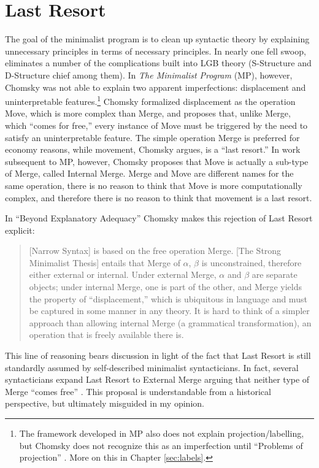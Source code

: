 \documentclass[MilwayThesis]{subfiles}
\begin{document}
\section{Last Resort}
The goal of the minimalist program is to clean up syntactic theory by explaining unnecessary principles in terms of necessary principles.
In nearly one fell swoop, \textcite{chomsky1995minimalist} eliminates a number of the complications built into LGB theory (S-Structure and D-Structure chief among them).
In \textit{The Minimalist Program} (MP), however, Chomsky was not able to explain two apparent imperfections: displacement and uninterpretable features.\footnote{
	The framework developed in MP also does not explain projection/labelling, but Chomsky does not recognize this as an imperfection until ``Problems of projection'' \parencite{chomsky2013problems}.
	More on this in Chapter \ref{sec:labels}.
}
Chomsky formalized displacement as the operation Move, which is more complex than Merge, and proposes that, unlike Merge, which ``comes for free,'' every instance of Move must be triggered by the need to satisfy an uninterpretable feature.
The simple operation Merge is preferred for economy reasons, while movement, Chomsky argues, is a ``last resort.''
In work subsequent to MP, however, Chomsky proposes that Move is actually a sub-type of Merge, called Internal Merge.
Merge and Move are different names for the same operation, there is no reason to think that Move is more computationally complex, and therefore there is no reason to think that movement is a last resort.

In ``Beyond Explanatory Adequacy'' \parencite{chomsky2004beyond} Chomsky makes this rejection of Last Resort explicit:
\begin{quote}
	[Narrow Syntax] is based on the free operation Merge.
	[The Strong Minimalist Thesis] entails that Merge of $\alpha$, $\beta$ is unconstrained, therefore either external or internal.
	Under external Merge, $\alpha$ and $\beta$ are separate objects; 
	under internal Merge, one is part of the other, and Merge yields the property of ``displacement,'' which is ubiquitous in language and must be captured in some manner in any theory. 
	It is hard to think of a simpler approach than allowing	internal Merge (a grammatical transformation), an operation that is freely available there is.
	\parencite[110]{chomsky2004beyond}
\end{quote}
This line of reasoning bears discussion in light of the fact that Last Resort is still standardly assumed by self-described minimalist syntacticians.
In fact, several syntacticians expand Last Resort to External Merge arguing that neither type of Merge ``comes free'' \parencite{pesetsky2006probes,frampton2008crash,wurmbrand2014merge,yokoyama2015features}.
This proposal is understandable from a historical perspective, but ultimately misguided in my opinion.
\end{document}
